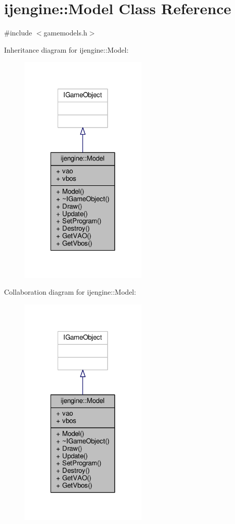 \hypertarget{structijengine_1_1Model}{\section{ijengine\-:\-:Model Class Reference}
\label{structijengine_1_1Model}
}


{\ttfamily \#include $<$gamemodels.\-h$>$}



Inheritance diagram for ijengine\-:\-:Model\-:\nopagebreak
\begin{figure}[H]
\begin{center}
\leavevmode
\includegraphics[width=174pt]{structijengine_1_1Model__inherit__graph}
\end{center}
\end{figure}


Collaboration diagram for ijengine\-:\-:Model\-:\nopagebreak
\begin{figure}[H]
\begin{center}
\leavevmode
\includegraphics[width=174pt]{structijengine_1_1Model__coll__graph}
\end{center}
\end{figure}
